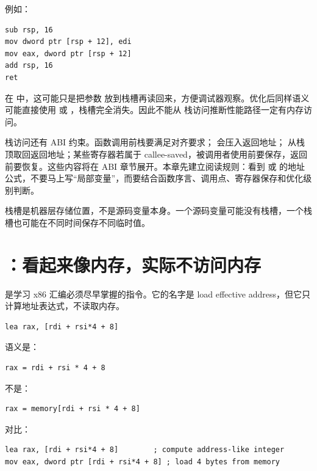 例如：

\begin{lstlisting}
sub rsp, 16
mov dword ptr [rsp + 12], edi
mov eax, dword ptr [rsp + 12]
add rsp, 16
ret
\end{lstlisting}

在  中，这可能只是把参数  放到栈槽再读回来，方便调试器观察。优化后同样语义可能直接使用  或 ，栈槽完全消失。因此不能从  栈访问推断性能路径一定有内存访问。

栈访问还有 ABI 约束。函数调用前栈要满足对齐要求； 会压入返回地址； 从栈顶取回返回地址；某些寄存器若属于 callee-saved，被调用者使用前要保存，返回前要恢复。这些内容将在 ABI 章节展开。本章先建立阅读规则：看到  或  的地址公式，不要马上写“局部变量”，而要结合函数序言、调用点、寄存器保存和优化级别判断。

\begin{warningbox}
栈槽是机器层存储位置，不是源码变量本身。一个源码变量可能没有栈槽，一个栈槽也可能在不同时间保存不同临时值。
\end{warningbox}

\section{：看起来像内存，实际不访问内存}

 是学习 x86 汇编必须尽早掌握的指令。它的名字是 load effective address，但它只计算地址表达式，不读取内存。

\begin{lstlisting}
lea rax, [rdi + rsi*4 + 8]
\end{lstlisting}

语义是：

\begin{lstlisting}
rax = rdi + rsi * 4 + 8
\end{lstlisting}

不是：

\begin{lstlisting}
rax = memory[rdi + rsi * 4 + 8]
\end{lstlisting}

对比：

\begin{lstlisting}
lea rax, [rdi + rsi*4 + 8]        ; compute address-like integer
mov eax, dword ptr [rdi + rsi*4 + 8] ; load 4 bytes from memory
\end{lstlisting}

